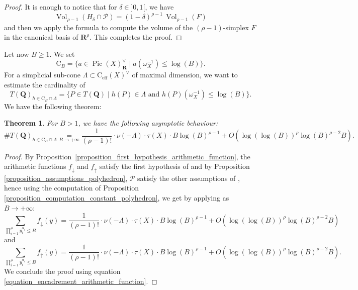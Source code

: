 \documentclass{proc-l}
\newcommand{\R}{\mathbf{R}}
\newcommand{\Q}{\mathbf{Q}}
\newcommand{\cone}{\text{C}_{\text{eff}}(X)}
\DeclareMathOperator{\Pic}{Pic}
\DeclareMathOperator{\Vol}{Vol}
\newcommand{\stackP}{\mathcal{P}}
\newcommand{\w}{\omega}
\newtheorem{theorem}{Theorem}[section]
\theoremstyle{definition}
\theoremstyle{remark}
\numberwithin{equation}{section}
\begin{document}
\begin{proof}
It is enough to notice that for $\delta \in ]0,1[$, we have
$$
\Vol_{\rho - 1}(H_{\delta} \cap \stackP)
= (1-\delta)^{\rho-1} \, \Vol_{\rho-1}(F)
$$and then we apply the formula to compute the volume of the $(\rho-1)$-simplex $F$ in the canonical basis of $\R^{\rho}$. This completes the proof.  
\end{proof}


Let now $B \geqslant 1$.  
We set  
\[
    \mathrm{C}_B = \{ a \in \Pic(X)_{\R}^{\vee} \mid a(\w_{X}^{-1}) \leqslant \log(B) \}.
\]  
For a simplicial sub-cone $\Lambda \subset \cone^{\vee}$ of maximal dimension, we want to estimate the cardinality of  
\[
    T(\Q)_{h \in \mathrm{C}_B \cap \Lambda} = \{ P \in T(\Q) \mid h(P) \in \Lambda \text{ and } h(P)(\w_{X}^{-1}) \leqslant \log(B) \}.
\]  
We have the following theorem:

\begin{theorem}\label{theorem_hyperbola_method_simplicial_cone}
    For $B > 1$, we have the following asymptotic behaviour:
    \[
        \# T(\Q)_{h \in \mathrm{C}_B \cap \Lambda}
        \underset{B \to +\infty}{=}
        \frac{1}{(\rho - 1)!} \cdot \nu(-\Lambda) \cdot \tau(X) \cdot B \log(B)^{\rho - 1}
        + O\!\left( \log(\log(B))^{\rho} \log(B)^{\rho - 2} B \right).
    \]
\end{theorem}

\begin{proof}
    By Proposition~\ref{proposition_first_hypothesis_arithmetic_function}, the arithmetic functions $f_{\downarrow}$ and $f_{\uparrow}$ satisfy the first hypothesis of \cite[Theorem~1.1]{pieropan_hyperbola_method} and by Proposition  \ref{proposition_assumptions_polyhedron}, $\stackP$ satisfy the other assumptions of \cite[Theorem~1.1]{pieropan_hyperbola_method}, hence using the computation of Proposition \ref{proposition_computation_constant_polyhedron}, we get by applying \cite[Theorem~1.1]{pieropan_hyperbola_method} as $B \rightarrow + \infty$:
    $$\sum\limits_{\prod\limits_{i = 1}^{\rho} y_i^{\alpha_{i}} \leqslant B } f_{\downarrow}(y)  =
        \frac{1}{(\rho - 1)!} \cdot \nu(-\Lambda) \cdot \tau(X) \cdot B \log(B)^{\rho - 1}
        + O\!\left( \log(\log(B))^{\rho} \log(B)^{\rho - 2} B \right) $$and $$ \sum\limits_{\prod\limits_{i = 1}^{\rho} y_i^{\alpha_{i}} \leqslant B } f_{\uparrow}(y) =
        \frac{1}{(\rho - 1)!} \cdot \nu(-\Lambda) \cdot \tau(X) \cdot B \log(B)^{\rho - 1}
        + O\!\left( \log(\log(B))^{\rho} \log(B)^{\rho - 2} B \right).$$We conclude the proof using equation \ref{equation_encadrement_arithmetic_function}.
\end{proof}
\end{document}
